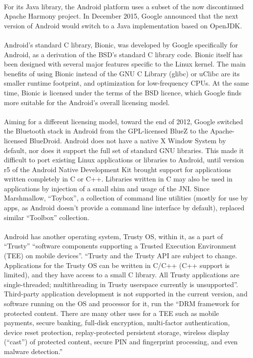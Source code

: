 \documentclass[a4paper,12pt]{report}
\begin{document}
\paragraph{}For its Java library, the Android platform uses a subset of the now discontinued Apache Harmony project. In December 2015, Google announced that the next version of Android would switch to a Java implementation based on OpenJDK.
\paragraph{}Android's standard C library, Bionic, was developed by Google specifically for Android, as a derivation of the BSD's standard C library code. Bionic itself has been designed with several major features specific to the Linux kernel. The main benefits of using Bionic instead of the GNU C Library (glibc) or uClibc are its smaller runtime footprint, and optimization for low-frequency CPUs. At the same time, Bionic is licensed under the terms of the BSD licence, which Google finds more suitable for the Android's overall licensing model.
\paragraph{}Aiming for a different licensing model, toward the end of 2012, Google switched the Bluetooth stack in Android from the GPL-licensed BlueZ to the Apache-licensed BlueDroid. Android does not have a native X Window System by default, nor does it support the full set of standard GNU libraries. This made it difficult to port existing Linux applications or libraries to Android, until version r5 of the Android Native Development Kit brought support for applications written completely in C or C++. Libraries written in C may also be used in applications by injection of a small shim and usage of the JNI. Since Marshmallow, ``Toybox'', a collection of command line utilities (mostly for use by apps, as Android doesn't provide a command line interface by default), replaced similar ``Toolbox'' collection.
\paragraph{}Android has another operating system, Trusty OS, within it, as a part of ``Trusty'' ``software components supporting a Trusted Execution Environment (TEE) on mobile devices''. ``Trusty and the Trusty API are subject to change. Applications for the Trusty OS can be written in C/C++ (C++ support is limited), and they have access to a small C library. All Trusty applications are single-threaded; multithreading in Trusty userspace currently is unsupported''. Third-party application development is not supported in the current version, and software running on the OS and processor for it, run the ``DRM framework for protected content.  There are many other uses for a TEE such as mobile payments, secure banking, full-disk encryption, multi-factor authentication, device reset protection, replay-protected persistent storage, wireless display (``cast'') of protected content, secure PIN and fingerprint processing, and even malware detection.'' 
\end{document}
